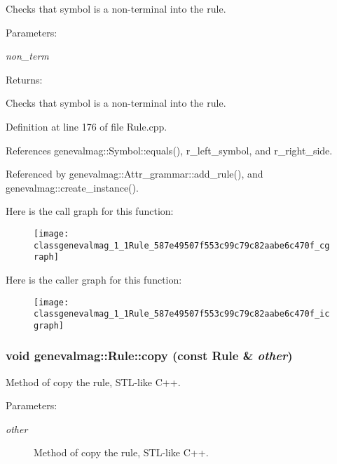 Checks that symbol is a non-terminal into the rule. \begin{Desc}
\item[Parameters:]
\begin{description}
\item[{\em non\_\-term}]\end{description}
\end{Desc}
\begin{Desc}
\item[Returns:]\end{Desc}
Checks that symbol is a non-terminal into the rule. 

Definition at line 176 of file Rule.cpp.

References genevalmag::Symbol::equals(), r\_\-left\_\-symbol, and r\_\-right\_\-side.

Referenced by genevalmag::Attr\_\-grammar::add\_\-rule(), and genevalmag::create\_\-instance().

Here is the call graph for this function:\nopagebreak
\begin{figure}[H]
\begin{center}
\leavevmode
\texttt{[image: classgenevalmag\_1\_1Rule\_587e49507f553c99c79c82aabe6c470f\_cgraph]}
\end{center}
\end{figure}


Here is the caller graph for this function:\nopagebreak
\begin{figure}[H]
\begin{center}
\leavevmode
\texttt{[image: classgenevalmag\_1\_1Rule\_587e49507f553c99c79c82aabe6c470f\_icgraph]}
\end{center}
\end{figure}
\hypertarget{classgenevalmag_1_1Rule_79dbd2cb842fc959aa78e178daca89e2}{
\subsubsection[{copy}]{\setlength{\rightskip}{0pt plus 5cm}void genevalmag::Rule::copy (const {\bf Rule} \& {\em other})}}
\label{classgenevalmag_1_1Rule_79dbd2cb842fc959aa78e178daca89e2}


Method of copy the rule, STL-like C++. \begin{Desc}
\item[Parameters:]
\begin{description}
\item[{\em other}]Method of copy the rule, STL-like C++. \end{description}
\end{Desc}


